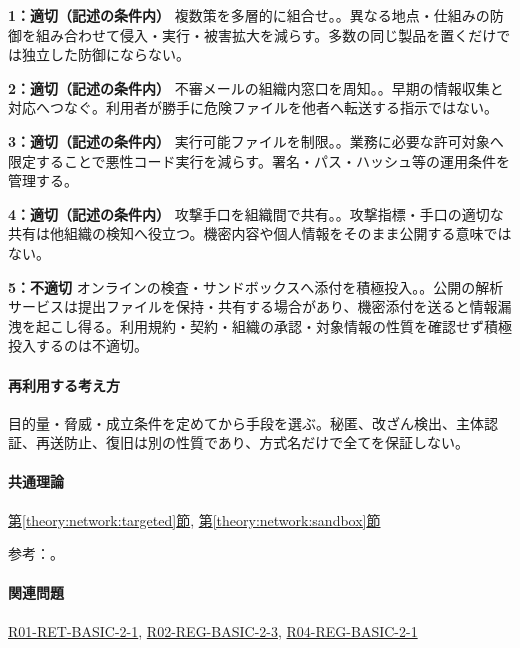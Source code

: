 \noindent\textbf{1：適切（記述の条件内）} 複数策を多層的に組合せ。。異なる地点・仕組みの防御を組み合わせて侵入・実行・被害拡大を減らす。多数の同じ製品を置くだけでは独立した防御にならない。\par

\noindent\textbf{2：適切（記述の条件内）} 不審メールの組織内窓口を周知。。早期の情報収集と対応へつなぐ。利用者が勝手に危険ファイルを他者へ転送する指示ではない。\par

\noindent\textbf{3：適切（記述の条件内）} 実行可能ファイルを制限。。業務に必要な許可対象へ限定することで悪性コード実行を減らす。署名・パス・ハッシュ等の運用条件を管理する。\par

\noindent\textbf{4：適切（記述の条件内）} 攻撃手口を組織間で共有。。攻撃指標・手口の適切な共有は他組織の検知へ役立つ。機密内容や個人情報をそのまま公開する意味ではない。\par

\noindent\textbf{5：不適切} オンラインの検査・サンドボックスへ添付を積極投入。。公開の解析サービスは提出ファイルを保持・共有する場合があり、機密添付を送ると情報漏洩を起こし得る。利用規約・契約・組織の承認・対象情報の性質を確認せず積極投入するのは不適切。\par

\paragraph{再利用する考え方} 目的量・脅威・成立条件を定めてから手段を選ぶ。秘匿、改ざん検出、主体認証、再送防止、復旧は別の性質であり、方式名だけで全てを保証しない。

\paragraph{共通理論} \hyperref[theory:network:targeted]{第\ref*{theory:network:targeted}節}, \hyperref[theory:network:sandbox]{第\ref*{theory:network:sandbox}節}

\par 参考：\cite{net_target2020,net_target2023}。

\paragraph{関連問題} \hyperref[q:r01-ret-basic-2-1]{R01-RET-BASIC-2-1}, \hyperref[q:r02-reg-basic-2-3]{R02-REG-BASIC-2-3}, \hyperref[q:r04-reg-basic-2-1]{R04-REG-BASIC-2-1}

